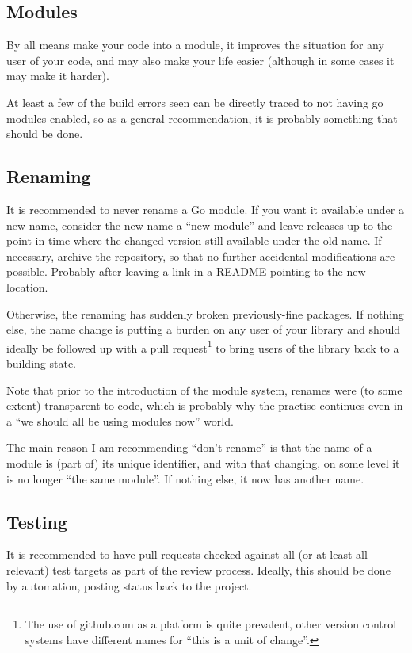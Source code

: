 \documentclass[a4paper]{paper}
\begin{document}
\subsection{Modules}

By all means make your code into a module, it improves the situation
for any user of your code, and may also make your life easier
(although in some cases it may make it harder).

At least a few of the build errors seen can be directly traced to not
having go modules enabled, so as a general recommendation, it is
probably something that should be done.

\subsection{Renaming}
It is recommended to never rename a Go module. If you want it available
under a new name, consider the new name a ``new module'' and leave
releases up to the point in time where the changed version still
available under the old name. If necessary, archive the repository, so
that no further accidental modifications are possible. Probably after
leaving a link in a README pointing to the new location.

Otherwise, the renaming has suddenly broken previously-fine
packages. If nothing else, the name change is putting a burden on any
user of your library and should ideally be followed up with a pull
request\footnote{The use of github.com as a platform is quite
  prevalent, other version control systems have different names for
  ``this is a unit of change''.} to bring users of the library back to
a building state.

Note that prior to the introduction of the module system, renames were
(to some extent) transparent to code, which is probably why the
practise continues even in a ``we should all be using modules now''
world.

The main reason I am recommending ``don't rename'' is that the name of
a module is (part of) its unique identifier, and with that changing,
on some level it is no longer ``the same module''. If nothing else, it
now has another name.

\subsection{Testing}

It is recommended to have pull requests checked against all (or at
least all relevant) test targets as part of the review
process. Ideally, this should be done by automation, posting status
back to the project.
\end{document}
